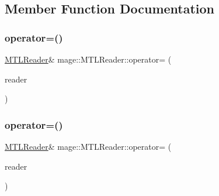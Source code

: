 \subsection{Member Function Documentation}
\hypertarget{classmage_1_1_m_t_l_reader_ae239ac085326919918a418edabcafeae}{}\label{classmage_1_1_m_t_l_reader_ae239ac085326919918a418edabcafeae} 
\subsubsection{\texorpdfstring{operator=()}{operator=()}\hspace{0.1cm}{\footnotesize\ttfamily [1/2]}}
{\footnotesize\ttfamily \hyperlink{classmage_1_1_m_t_l_reader}{M\+T\+L\+Reader}\& mage\+::\+M\+T\+L\+Reader\+::operator= (\begin{DoxyParamCaption}\item[{const \hyperlink{classmage_1_1_m_t_l_reader}{M\+T\+L\+Reader} \&}]{reader }\end{DoxyParamCaption})\hspace{0.3cm}{\ttfamily [delete]}}

\hypertarget{classmage_1_1_m_t_l_reader_aa777389ff4a3cd2f1df2cbf5c6da708e}{}\label{classmage_1_1_m_t_l_reader_aa777389ff4a3cd2f1df2cbf5c6da708e} 
\subsubsection{\texorpdfstring{operator=()}{operator=()}\hspace{0.1cm}{\footnotesize\ttfamily [2/2]}}
{\footnotesize\ttfamily \hyperlink{classmage_1_1_m_t_l_reader}{M\+T\+L\+Reader}\& mage\+::\+M\+T\+L\+Reader\+::operator= (\begin{DoxyParamCaption}\item[{\hyperlink{classmage_1_1_m_t_l_reader}{M\+T\+L\+Reader} \&\&}]{reader }\end{DoxyParamCaption})\hspace{0.3cm}{\ttfamily [delete]}}

\hypertarget{classmage_1_1_m_t_l_reader_ac3981549364be195f96b32cfafc8b147}{}\label{classmage_1_1_m_t_l_reader_ac3981549364be195f96b32cfafc8b147} 

